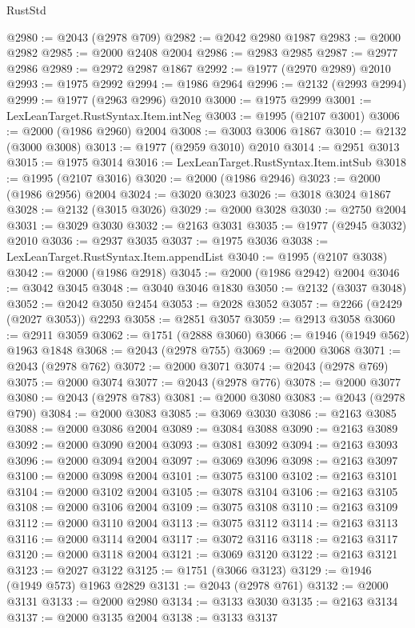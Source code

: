 \begin{lexlean}{RustStd}
\begin{coremodule}
@2980 := @2043 (@2978 @709)
@2982 := @2042 @2980 @1987
@2983 := @2000 @2982
@2985 := @2000 @2408 @2004
@2986 := @2983 @2985
@2987 := @2977 @2986
@2989 := @2972 @2987 @1867
@2992 := @1977 (@2970 @2989) @2010
@2993 := @1975 @2992
@2994 := @1986 @2964
@2996 := @2132 (@2993 @2994)
@2999 := @1977 (@2963 @2996) @2010
@3000 := @1975 @2999
@3001 := LexLeanTarget.RustSyntax.Item.intNeg
@3003 := @1995 (@2107 @3001)
@3006 := @2000 (@1986 @2960) @2004
@3008 := @3003 @3006 @1867
@3010 := @2132 (@3000 @3008)
@3013 := @1977 (@2959 @3010) @2010
@3014 := @2951 @3013
@3015 := @1975 @3014
@3016 := LexLeanTarget.RustSyntax.Item.intSub
@3018 := @1995 (@2107 @3016)
@3020 := @2000 (@1986 @2946)
@3023 := @2000 (@1986 @2956) @2004
@3024 := @3020 @3023
@3026 := @3018 @3024 @1867
@3028 := @2132 (@3015 @3026)
@3029 := @2000 @3028
@3030 := @2750 @2004
@3031 := @3029 @3030
@3032 := @2163 @3031
@3035 := @1977 (@2945 @3032) @2010
@3036 := @2937 @3035
@3037 := @1975 @3036
@3038 := LexLeanTarget.RustSyntax.Item.appendList
@3040 := @1995 (@2107 @3038)
@3042 := @2000 (@1986 @2918)
@3045 := @2000 (@1986 @2942) @2004
@3046 := @3042 @3045
@3048 := @3040 @3046 @1830
@3050 := @2132 (@3037 @3048)
@3052 := @2042 @3050 @2454
@3053 := @2028 @3052
@3057 := @2266 (@2429 (@2027 @3053)) @2293
@3058 := @2851 @3057
@3059 := @2913 @3058
@3060 := @2911 @3059
@3062 := @1751 (@2888 @3060)
@3066 := @1946 (@1949 @562) @1963 @1848
@3068 := @2043 (@2978 @755)
@3069 := @2000 @3068
@3071 := @2043 (@2978 @762)
@3072 := @2000 @3071
@3074 := @2043 (@2978 @769)
@3075 := @2000 @3074
@3077 := @2043 (@2978 @776)
@3078 := @2000 @3077
@3080 := @2043 (@2978 @783)
@3081 := @2000 @3080
@3083 := @2043 (@2978 @790)
@3084 := @2000 @3083
@3085 := @3069 @3030
@3086 := @2163 @3085
@3088 := @2000 @3086 @2004
@3089 := @3084 @3088
@3090 := @2163 @3089
@3092 := @2000 @3090 @2004
@3093 := @3081 @3092
@3094 := @2163 @3093
@3096 := @2000 @3094 @2004
@3097 := @3069 @3096
@3098 := @2163 @3097
@3100 := @2000 @3098 @2004
@3101 := @3075 @3100
@3102 := @2163 @3101
@3104 := @2000 @3102 @2004
@3105 := @3078 @3104
@3106 := @2163 @3105
@3108 := @2000 @3106 @2004
@3109 := @3075 @3108
@3110 := @2163 @3109
@3112 := @2000 @3110 @2004
@3113 := @3075 @3112
@3114 := @2163 @3113
@3116 := @2000 @3114 @2004
@3117 := @3072 @3116
@3118 := @2163 @3117
@3120 := @2000 @3118 @2004
@3121 := @3069 @3120
@3122 := @2163 @3121
@3123 := @2027 @3122
@3125 := @1751 (@3066 @3123)
@3129 := @1946 (@1949 @573) @1963 @2829
@3131 := @2043 (@2978 @761)
@3132 := @2000 @3131
@3133 := @2000 @2980
@3134 := @3133 @3030
@3135 := @2163 @3134
@3137 := @2000 @3135 @2004
@3138 := @3133 @3137

\end{coremodule}
\end{lexlean}
